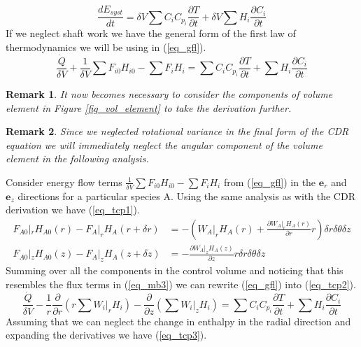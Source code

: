 \documentclass[11pt,fleqn]{article}
\theoremstyle{defstyle}
\newtheorem{rmrk}{Remark}[section]
\begin{document}
\begin{equation}
\frac{d E_{syst}}{dt} = \delta V \sum C_i C_{p_i} \frac{\partial T}{\partial t} + \delta V \sum H_i \frac{\partial C_i}{\partial t} 
\label{eq_syse2}
\end{equation}
If we neglect shaft work we have the general form of the first law of thermodynamics we will be using in (\ref{eq_gfl}).  
\begin{equation}
\frac{\dot{Q}}{\delta V} + \frac{1}{\delta V}\sum F_{i0}H_{i0} -\sum F_{i}H_{i} =\sum C_i C_{p_i} \frac{\partial T}{\partial t} + \sum H_i \frac{\partial C_i}{\partial t}
\label{eq_gfl}
\end{equation}
\begin{rmrk}
It now becomes necessary to consider the components of volume element  in Figure \ref{fig_vol_element} to take the derivation further.
\end{rmrk}
\begin{rmrk}
Since we neglected rotational variance in the final form of the CDR equation we will immediately neglect the angular component of the volume element in the following analysis.  
\end{rmrk}
Consider energy flow terms $\frac{1}{\delta V}\sum F_{i0}H_{i0} -\sum F_{i}H_{i}$ from (\ref{eq_gfl}) in the $\mathbf{e}_r$ and $\mathbf{e}_z$ directions for a particular species A. Using the same analysis as with the CDR derivation we have (\ref{eq_tcp1}).
\begin{equation}
\begin{aligned}
F_{A0}|_r H_{A0}(r) - F_{A}|_rH_{A}(r+\delta r) &= -(W_A|_r H_A(r) + \frac{\partial W_A|_r H_A(r)}{\partial r}r)\delta r \delta \theta \delta z \\
F_{A0}|_z H_{A0}(z) - F_{A}|_z H_{A}(z+\delta z) &= -\frac{\partial W_A|_z H_A(z)}{\partial z}r \delta r \delta \theta \delta z   
\end{aligned}
\label{eq_tcp1}
\end{equation}
Summing over all the components in the control volume and noticing that this resembles the flux terms in (\ref{eq_mb3}) we can rewrite (\ref{eq_gfl}) into (\ref{eq_tcp2}).
\begin{equation}
\frac{\dot{Q}}{\delta V} - \frac{1}{r}\frac{\partial}{\partial r}(r\sum W_i|_r H_i) - \frac{\partial}{\partial z}(\sum W_i|_z H_i) =\sum C_i C_{p_i} \frac{\partial T}{\partial t} + \sum H_i \frac{\partial C_i}{\partial t}
\label{eq_tcp2}
\end{equation}
Assuming that we can neglect the change in enthalpy in the radial direction and expanding the derivatives we have (\ref{eq_tcp3}).
\end{document}
